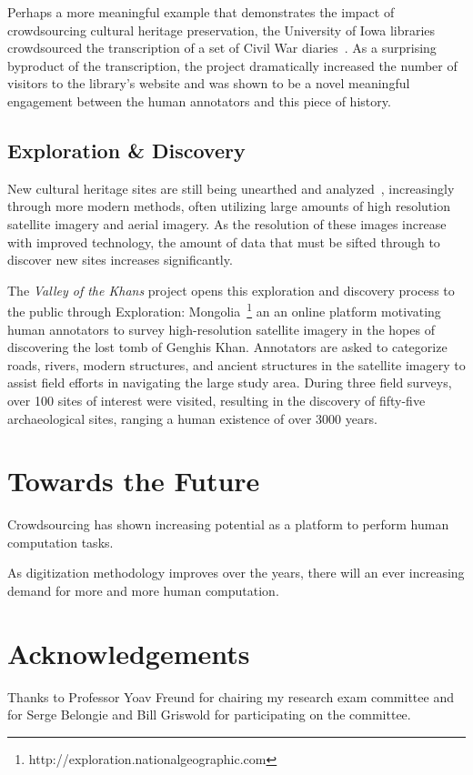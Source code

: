 \documentclass[10pt,twocolumn]{article}
\begin{document}
Perhaps a more meaningful example that demonstrates the impact of 
crowdsourcing cultural heritage preservation, the University of Iowa 
libraries crowdsourced the transcription of a set of Civil War 
diaries~\cite{Owens2013}. As a surprising byproduct of the transcription, the
project dramatically increased the number of visitors to the library's
website and was shown to be a novel meaningful engagement between the human
annotators and this piece of history.


\subsection{Exploration \& Discovery}
New cultural heritage sites are still being unearthed and 
analyzed~\cite{Lasaponara2007,Rowlands2007,Alexakis2009}, increasingly 
through more modern methods, often utilizing large amounts of
high resolution satellite imagery and aerial imagery. As the resolution of
these images increase with improved technology, the amount of data that must
be sifted through to discover new sites increases significantly.

The \textit{Valley of the Khans} project opens this exploration and discovery
process to the public through Exploration: 
Mongolia~\footnote{http://exploration.nationalgeographic.com} an
an online platform motivating human annotators to survey high-resolution
satellite imagery in the hopes of discovering the lost tomb of Genghis Khan.
Annotators are asked to categorize roads, rivers, modern structures, and
ancient structures in the satellite imagery to assist field efforts in
navigating the large study area. During three field surveys, over 100
sites of interest were visited, resulting in the discovery of fifty-five
archaeological sites, ranging a human existence of over 3000 years.


\section{Towards the Future}
Crowdsourcing has shown increasing potential as a platform to perform
human computation tasks. 
	
As digitization methodology improves over the years, there will an 
ever increasing demand for more and more human computation.

\section{Acknowledgements}
Thanks to Professor Yoav Freund for chairing my research exam committee and 
for Serge Belongie and Bill Griswold for participating on the committee.



\end{document}
